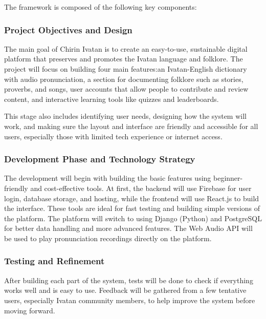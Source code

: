         The framework is composed of the following key components:
            \subsubsection{Project Objectives and Design}
            The main goal of Chirin Ivatan is to create an easy-to-use, sustainable digital platform that preserves and promotes the Ivatan language and folklore. The project will focus on building four main features:an Ivatan-English dictionary with audio pronunciation, a section for documenting folklore such as stories, proverbs, and songs, user accounts that allow people to contribute and review content, and interactive learning tools like quizzes and leaderboards.

            This stage also includes identifying user needs, designing how the system will work, and making sure the layout and interface are friendly and accessible for all users, especially those with limited tech experience or internet access.
            \subsubsection{Development Phase and Technology Strategy}
            The development will begin with building the basic features using beginner-friendly and cost-effective tools. At first, the backend will use Firebase for user login, database storage, and hosting, while the frontend will use React.js to build the interface. These tools are ideal for fast testing and building simple versions of the platform. The platform will switch to using Django (Python) and PostgreSQL for better data handling and more advanced features. The Web Audio API will be used to play pronunciation recordings directly on the platform.
            \subsubsection{Testing and Refinement}
            After building each part of the system, tests will be done to check if everything works well and is easy to use. Feedback will be gathered from a few tentative users, especially Ivatan community members, to help improve the system before moving forward.

